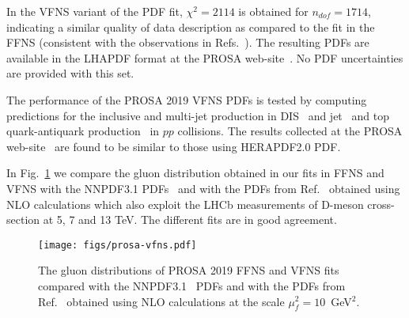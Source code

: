 In the VFNS variant of the PDF fit, $\chi^2 = 2114$ is obtained for $n_{dof} = 1714$, indicating a similar quality of data description as compared to the fit in the FFNS {\color{blue}(consistent with the observations in Refs.~\cite{Abramowicz:2015mha,H1:2018flt}).} The resulting PDFs are available in the LHAPDF format at the PROSA web-site~\cite{prosaweb}. No PDF uncertainties are provided with this set.

The performance of the PROSA 2019 VFNS PDFs is tested by computing predictions for the inclusive and multi-jet production in DIS~\cite{Chekanov:2002be,Chekanov:2006xr,Abramowicz:2010cka,Aktas:2007aa,Aaron:2010ac} 
and jet~\cite{Chatrchyan:2012bja} and top quark-antiquark production~\cite{Sirunyan:2017azo,Sirunyan:2019zvx} in $pp$ collisions. The results collected at the PROSA web-site~\cite{prosaweb} are found to be similar to those using HERAPDF2.0 PDF.

{\color{blue} In Fig.~\ref{fig:vfns} we compare the gluon distribution obtained in our fits in FFNS and VFNS with the NNPDF3.1 PDFs~\cite{Ball:2017nwa} and with the PDFs from Ref.~\cite{Bertone:2018dse} obtained using NLO calculations which also exploit the LHCb measurements of D-meson cross-section at 5, 7 and 13 TeV. The different fits are in good agreement.}

\begin{figure}
	\centering
	\texttt{[image: figs/prosa-vfns.pdf]}
	\caption{The gluon distributions of PROSA 2019 FFNS and VFNS fits compared with the NNPDF3.1~\cite{Ball:2017nwa} PDFs and with the PDFs from Ref.~\cite{Bertone:2018dse} obtained using NLO calculations at the scale $\mu^2_f=10$~GeV$^2$.}
	\label{fig:vfns}
\end{figure}


